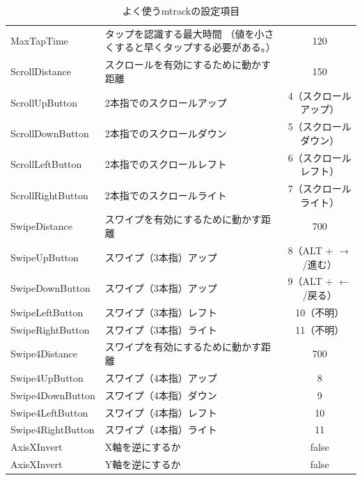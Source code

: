 \documentclass[mingoth,a4paper]{jsarticle}
\begin{document}
\begin{table}[htb]
\begin{tabular}{llc}
    MaxTapTime & タップを認識する最大時間 （値を小さくすると早くタップする必要がある。）& 120 \\
    ScrollDistance & スクロールを有効にするために動かす距離 & 150\\
    ScrollUpButton & 2本指でのスクロールアップ& 4（スクロールアップ）\\
    ScrollDownButton & 2本指でのスクロールダウン & 5（スクロールダウン）\\
    ScrollLeftButton & 2本指でのスクロールレフト& 6（スクロールレフト）\\
    ScrollRightButton & 2本指でのスクロールライト& 7（スクロールライト）\\
    SwipeDistance & スワイプを有効にするために動かす距離 & 700\\
    SwipeUpButton & スワイプ（3本指）アップ & 8（ALT + $\rightarrow$/進む） \\
    SwipeDownButton & スワイプ（3本指）アップ& 9（ALT + $\leftarrow$/戻る） \\
    SwipeLeftButton & スワイプ（3本指）レフト & 10（不明） \\
    SwipeRightButton & スワイプ（3本指）ライト& 11（不明） \\
    Swipe4Distance & スワイプを有効にするために動かす距離 & 700\\
    Swipe4UpButton & スワイプ（4本指）アップ　& 8 \\
    Swipe4DownButton & スワイプ（4本指）ダウン　& 9 \\
    Swipe4LeftButton & スワイプ（4本指）レフト　& 10\\
    Swipe4RightButton & スワイプ（4本指）ライト　& 11\\
    AxisXInvert & X軸を逆にするか & false \\
    AxisXInvert & Y軸を逆にするか & false \\
  \end{tabular}
\caption{よく使うmtrackの設定項目}
\label{fig:mtrack-config}
\end{table}
\end{document}
